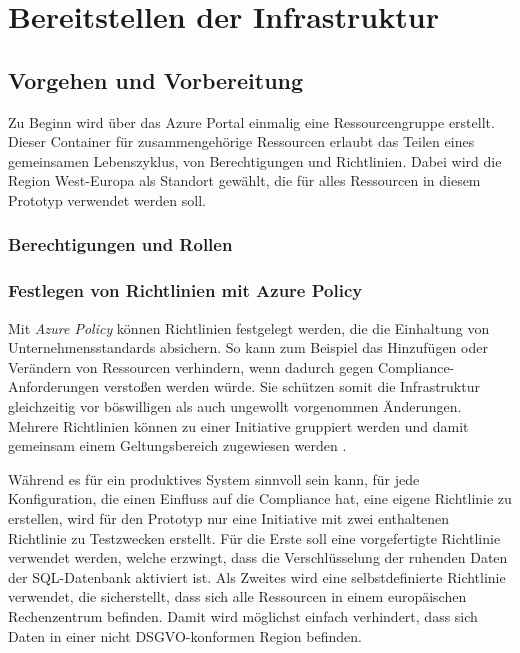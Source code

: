\section{Bereitstellen der Infrastruktur} \label{sec:infra}

\subsection{Vorgehen und Vorbereitung} \label{subsec:infra:azDevOps}
Zu Beginn wird über das Azure Portal einmalig eine Ressourcengruppe erstellt. Dieser Container für zusammengehörige Ressourcen erlaubt das Teilen eines gemeinsamen Lebenszyklus, von Berechtigungen und Richtlinien. Dabei wird die Region West-Europa als Standort gewählt, die für alles Ressourcen in diesem Prototyp verwendet werden soll. 

\subsubsection{Berechtigungen und Rollen} \label{subsec:infra:prep:aad}

\subsubsection{Festlegen von Richtlinien mit Azure Policy} \label{subsec:infra:prep:policy}
Mit \textit{Azure Policy} können Richtlinien festgelegt werden, die die Einhaltung von Unternehmensstandards absichern. So kann zum Beispiel das Hinzufügen oder Verändern von Ressourcen verhindern, wenn dadurch gegen Compliance-Anforderungen verstoßen werden würde. Sie schützen somit die Infrastruktur gleichzeitig vor böswilligen als auch ungewollt vorgenommen Änderungen. Mehrere Richtlinien können zu einer Initiative gruppiert werden und damit gemeinsam einem Geltungsbereich zugewiesen werden \cite{de_tender_azure_2019}.

Während es für ein produktives System sinnvoll sein kann, für jede Konfiguration, die einen Einfluss auf die Compliance hat, eine eigene Richtlinie zu erstellen, wird für den Prototyp nur eine Initiative mit zwei enthaltenen Richtlinie zu Testzwecken erstellt. Für die Erste soll eine vorgefertigte Richtlinie verwendet werden, welche erzwingt, dass die Verschlüsselung der ruhenden Daten der SQL-Datenbank aktiviert ist. Als Zweites wird eine selbstdefinierte Richtlinie verwendet, die sicherstellt, dass sich alle Ressourcen in einem europäischen Rechenzentrum befinden. Damit wird möglichst einfach verhindert, dass sich Daten in einer nicht DSGVO-konformen Region befinden.

